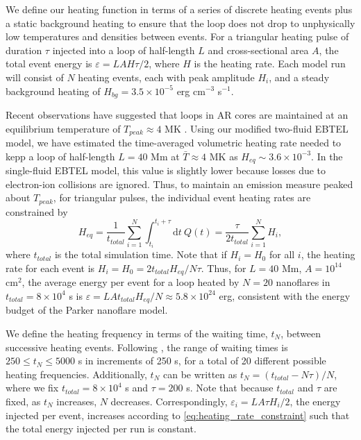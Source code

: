 \documentclass[apj]{emulateapj}
\begin{document}
	\par We define our heating function in terms of a series of discrete heating events plus a static background heating to ensure that the loop does not drop to unphysically low temperatures and densities between events. For a triangular heating pulse of duration $\tau$ injected into a loop of half-length $L$ and cross-sectional area $A$, the total  event energy is $\varepsilon=LAH\tau/2$, where $H$ is the heating rate. Each model run will consist of $N$ heating events, each with peak amplitude $H_i$, and a steady background heating of $H_{bg}=3.5\times10^{-5}$ erg cm$^{-3}$ s$^{-1}$.
	\par Recent observations have suggested that loops in AR cores are maintained at an equilibrium temperature of $T_{peak}\approx4$ MK \citep{warren_constraints_2011,warren_systematic_2012}. Using our modified two-fluid EBTEL model, we have estimated the time-averaged volumetric heating rate needed to kepp a loop of half-length $L=40$ Mm at $\bar{T}\approx4$ MK as  $H_{eq}\sim3.6\times10^{-3}$. In the single-fluid EBTEL model, this value is slightly lower because losses due to electron-ion collisions are ignored. Thus, to maintain an emission measure peaked about $T_{peak}$, for triangular pulses, the individual event heating rates are constrained by 
	\begin{equation}
		\label{eq:heating_rate_constraint}
		H_{eq} = \frac{1}{t_{total}}\sum_{i=1}^N\int_{t_i}^{t_i+\tau}\mathrm{d}t~Q(t) = \frac{\tau}{2t_{total}}\sum_{i=1}^NH_i,
	\end{equation}
	where $t_{total}$ is the total simulation time. Note that if $H_i=H_0$ for all $i$, the heating rate for each event is $H_i=H_0=2t_{total}H_{eq}/N\tau$. Thus, for $L=40$ Mm, $A=10^{14}$ cm$^2$, the average energy per event for a loop heated by $N=20$ nanoflares in $t_{total}=8\times10^4$ s is $\varepsilon=LAt_{total}H_{eq}/N\approx5.8\times10^{24}$ erg, consistent with the energy budget of the Parker nanoflare model. 
	\par We define the heating frequency in terms of the waiting time, $t_N$, between successive heating events. Following \citet{cargill_active_2014}, the range of waiting times is $250\le t_N\le5000$ s in increments of 250 s, for a total of 20 different possible heating frequencies. Additionally, $t_N$ can be written as $t_N=(t_{total}-N\tau)/N$, where we fix $t_{total}=8\times10^4$ s and $\tau=200$ s. Note that because $t_{total}$ and $\tau$ are fixed, as $t_N$ increases, $N$ decreases. Correspondingly, $\varepsilon_i=LA\tau H_i/2$, the energy injected per event, increases according to \autoref{eq:heating_rate_constraint} such that the total energy injected per run is constant.
\end{document}
